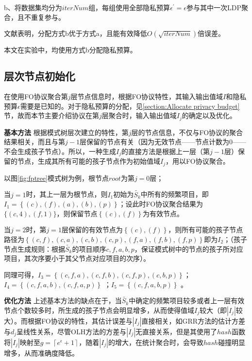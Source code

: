 \documentclass[UTF8]{ctexart}
\begin{document}
b、将数据集均分为$iterNum$组，每组使用全部隐私预算$\epsilon^{\prime} = \epsilon$参与其中一次LDP聚合，且不重复参与。

文献\cite{wang2018privtrie,wang2018locally}表明，分配方式b优于方式a，且能有效降低$O(\sqrt{iterNum})$倍误差。

本文在实验中，均使用方式b分配隐私预算。

\subsection{层次节点初始化}
  在使用FO协议聚合第$j$层节点信息时，根据FO协议特性，其输入输出值域$I$和隐私预算$\epsilon$需要是已知的。对于隐私预算的分配，见\ref{section:Allocate privacy budget}节，故而本节主要介绍协议在第$j$层聚合时，输入输出值域$I_j$的确定以及优化。

  \textbf{基本方法}
  根据模式树层次建立的特性，第$j$层的节点信息，不仅与FO协议的聚合结果相关，而且与第$j-1$层保留的节点有关（因为无效节点——节点计数为0——不会生成孩子节点）。所以，一种生成$I_j$的直接方法是根据上一层（第$j-1$层）保留的节点，生成其所有可能的孩子节点作为初始值域$I_j$，用以FO协议聚合。

  以图\ref{fig:fptree}模式树为例，根节点$root$为第$j=0$层；

  当$j = 1$时，其上一层为根节点，则$I_1$初始为$\tilde{S_k}$中所有的频繁项目，即$I_1 = \left\{ (c), (f), (a), (b) , (p)\right\}$；设此时FO协议聚合结果为$\{(c,4),(f,1)\}$，则保留节点$\left\{ (c), (f)\right\}$为有效节点。

  当$j = 2$时，第$j = 1$层保留的有效节点为$\left\{(c),(f) \right\}$，则所有可能的孩子节点路径为$\left\{(c,f),(c,a),(c,b),(c,p),(f,a),(f,b),(f,p)\right\}$即为$I_2$；（孩子节点生成规则：根据$\tilde{S_k}$的项目顺序$c,f,a,b,p$，保证模式树中的节点的孩子所对应项目，其次序要小于其父节点对应项目的次序）。

  同理可得，$I_3 =\left\{(c,f,a),(c,f,b),(c,f,p),(c,b,p) \right\}$；\\$I_4 = \left\{ (c,f,a,b),(c,f,a,p)\right\}$ ；$I_5 = \left\{ (c,f,a,b,p)\right\}$ 。

  \textbf{优化方法}
  上述基本方法的缺点在于，当$\tilde{S_k}$中确定的频繁项目较多或者上一层有效节点个数较多时，所生成的孩子节点会明显增多，从而使得值域$I_j$较大（即$|I_j|$较大）。而根据FO协议的特性，其估计误差与$| I_j |$直接相关，如GRR方法的估计方差与$d_j$呈线性关系，尽管OLH方法的方差与$|I_j|$无直接关系，但是其使用了$hash$函数将$|I_j|$映射至$g = \left \lceil e^{\epsilon}+1 \right \rceil$，随着$|I_j|$的增大，在统计聚合时，会导致$hash$碰撞明显增多，从而准确度降低。
 
\end{document}
